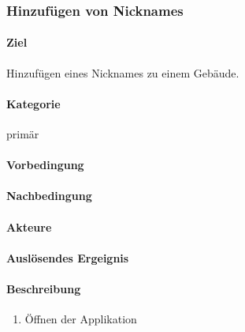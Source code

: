 \subsubsection{Hinzufügen von Nicknames}
\paragraph{Ziel}
Hinzufügen eines Nicknames zu einem Gebäude.
\paragraph{Kategorie}
primär
\paragraph{Vorbedingung}

\paragraph{Nachbedingung}

\paragraph{Akteure}

\paragraph{Auslösendes Ergeignis}

\paragraph{Beschreibung}
\begin{enumerate}
    \item Öffnen der Applikation
\end{enumerate}